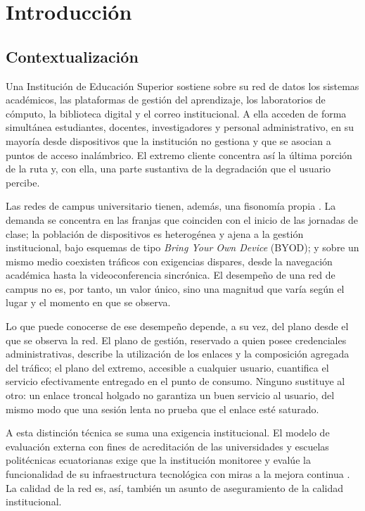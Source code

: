 \chapter{Introducción}
\label{chap:introduccion}

\section{Contextualización}

Una Institución de Educación Superior sostiene sobre su red de datos los sistemas académicos, las plataformas de gestión del aprendizaje, los laboratorios de cómputo, la biblioteca digital y el correo institucional. A ella acceden de forma simultánea estudiantes, docentes, investigadores y personal administrativo, en su mayoría desde dispositivos que la institución no gestiona y que se asocian a puntos de acceso inalámbrico. El extremo cliente concentra así la última porción de la ruta y, con ella, una parte sustantiva de la degradación que el usuario percibe.

Las redes de campus universitario tienen, además, una fisonomía propia \cite{kotz2005campus,henderson2004changing}. La demanda se concentra en las franjas que coinciden con el inicio de las jornadas de clase; la población de dispositivos es heterogénea y ajena a la gestión institucional, bajo esquemas de tipo \textit{Bring Your Own Device} (BYOD); y sobre un mismo medio coexisten tráficos con exigencias dispares, desde la navegación académica hasta la videoconferencia sincrónica. El desempeño de una red de campus no es, por tanto, un valor único, sino una magnitud que varía según el lugar y el momento en que se observa.

Lo que puede conocerse de ese desempeño depende, a su vez, del plano desde el que se observa la red. El plano de gestión, reservado a quien posee credenciales administrativas, describe la utilización de los enlaces y la composición agregada del tráfico; el plano del extremo, accesible a cualquier usuario, cuantifica el servicio efectivamente entregado en el punto de consumo. Ninguno sustituye al otro: un enlace troncal holgado no garantiza un buen servicio al usuario, del mismo modo que una sesión lenta no prueba que el enlace esté saturado.

A esta distinción técnica se suma una exigencia institucional. El modelo de evaluación externa con fines de acreditación de las universidades y escuelas politécnicas ecuatorianas exige que la institución monitoree y evalúe la funcionalidad de su infraestructura tecnológica con miras a la mejora continua \cite{caces2023modelo}. La calidad de la red es, así, también un asunto de aseguramiento de la calidad institucional.


